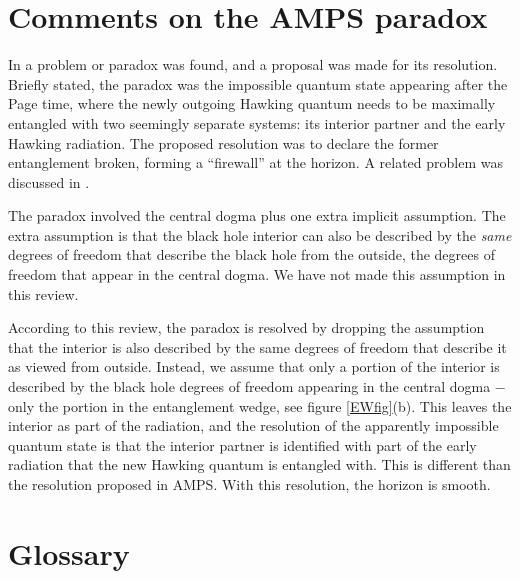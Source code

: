 
\section{Comments on the AMPS paradox } 

In \cite{Almheiri:2012rt}  a  problem or paradox  was found,  and a proposal was made for its resolution.   Briefly stated, the paradox was the impossible quantum state appearing after the Page time, where the newly outgoing Hawking quantum needs to be maximally entangled with two seemingly separate systems: its interior partner and the early Hawking radiation. The proposed resolution was to declare the former entanglement broken, forming a ``firewall'' at the horizon.
A related problem was discussed in \cite{Marolf:2012xe}. 

The paradox involved the central dogma plus one extra   implicit assumption. 
The extra assumption is that the black hole interior can also be described by the {\it same} 
degrees of freedom that describe the black hole from the outside, the degrees of freedom that appear in the central dogma.
 We have not made this assumption in this review. 

According to this review,  the  paradox is resolved by dropping the assumption that the interior is also described by the same degrees of freedom that describe it as viewed from outside.     Instead,  we assume that only a portion of the interior is described by the black hole degrees of freedom appearing in the central dogma $-$   only the portion in the entanglement wedge, see figure \ref{EWfig}(b).  This leaves the interior as part of the radiation, and the resolution of the apparently impossible quantum state is that the interior partner is identified with part of the early radiation that the new Hawking quantum is entangled with.
This is different than the resolution proposed in AMPS. With this resolution, the horizon is smooth. 
 

\section{Glossary}  

